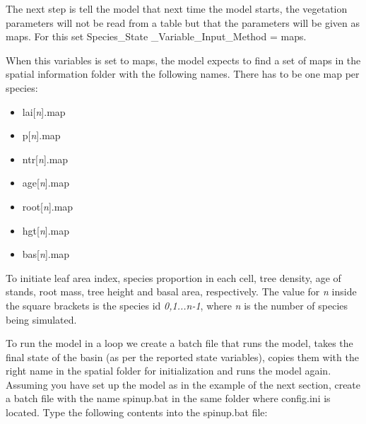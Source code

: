 The next step is tell the model that next time the model starts, the vegetation parameters will not be read from a table but that the parameters will be given as maps. For this set \textsf{Species\_State \_Variable\_Input\_Method = maps}.

When this variables is set to \textsf{maps}, the model expects to find a set of maps in the spatial information folder with the following names. There has to be one map per species:

\begin{itemize}

\item lai[\textit{n}].map
\item p[\textit{n}].map
\item ntr[\textit{n}].map
\item age[\textit{n}].map
\item root[\textit{n}].map
\item hgt[\textit{n}].map
\item bas[\textit{n}].map

\end{itemize}

To initiate leaf area index, species proportion in each cell, tree density, age of stands, root mass, tree height and basal area, respectively. The value for \textsf{\textit{n}} inside the square brackets is the species id \textsf{\textit{0,1...n-1}}, where \textsf{\textit{n}} is the number of species being simulated.     

To run the model in a loop we create a batch file that runs the model, takes the final state of the basin (as per the reported state variables), copies them with the right name in the spatial folder for initialization and runs the model again. Assuming you have set up the model as in the example of the next section, create a batch file with the name \textsf{spinup.bat} in the same folder where \textsf{config.ini} is located. Type the following contents into the \textsf{spinup.bat} file: 

